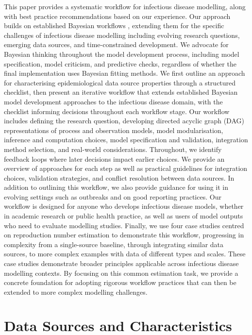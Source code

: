 \documentclass{article}
\begin{document}
This paper provides a systematic workflow for infectious disease modelling, along with best practice recommendations based on our experience.
Our approach builds on established Bayesian workflows \citep{gelman2020bayesian}, extending them for the specific challenges of infectious disease modelling including evolving research questions, emerging data sources, and time-constrained development.
We advocate for Bayesian thinking throughout the model development process, including model specification, model criticism, and predictive checks, regardless of whether the final implementation uses Bayesian fitting methods.
We first outline an approach for characterising epidemiological data source properties through a structured checklist, then present an iterative workflow that extends established Bayesian model development approaches to the infectious disease domain, with the checklist informing decisions throughout each workflow stage.
Our workflow includes defining the research question, developing directed acyclic graph (DAG) representations of process and observation models, model modularisation, inference and computation choices, model specification and validation, integration method selection, and real-world considerations.
Throughout, we identify feedback loops where later decisions impact earlier choices.
We provide an overview of approaches for each step as well as practical guidelines for integration choices, validation strategies, and conflict resolution between data sources.
In addition to outlining this workflow, we also provide guidance for using it in evolving settings such as outbreaks and on good reporting practices.
Our workflow is designed for anyone who develops infectious disease models, whether in academic research or public health practice, as well as users of model outputs who need to evaluate modelling studies.
Finally, we use four case studies centred on reproduction number estimation to demonstrate this workflow, progressing in complexity from a single-source baseline, through integrating similar data sources, to more complex examples with data of different types and scales.
These case studies demonstrate broader principles applicable across infectious disease modelling contexts.
By focusing on this common estimation task, we provide a concrete foundation for adopting rigorous workflow practices that can then be extended to more complex modelling challenges.

\section{Data Sources and Characteristics} \label{sec:datareview}
\end{document}
